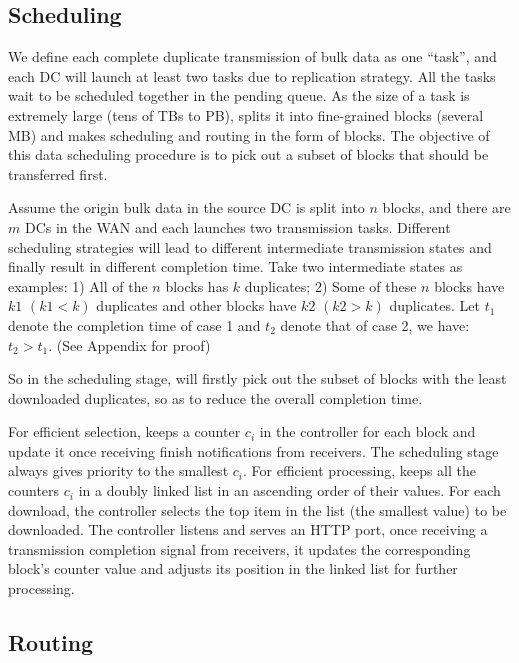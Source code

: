 \subsection{Scheduling}
\label{subsec:logic:scheduling}

We define each complete duplicate transmission of bulk data as one ``task'', and each DC will launch at least two tasks due to replication strategy. All the tasks wait to be scheduled together in the pending queue. As the size of a task is extremely large (tens of TBs to PB), \name splits it into fine-grained blocks (several MB) and makes scheduling and routing in the form of blocks. The objective of this data scheduling procedure is to pick out a subset of blocks that should be transferred first.

Assume the origin bulk data in the source DC is split into $n$ blocks, and there are $m$ DCs in the WAN and each launches two transmission tasks. Different scheduling strategies will lead to different intermediate transmission states and finally result in different completion time. Take two intermediate states as examples: 1) All of the $n$ blocks has $k$ duplicates; 2) Some of these $n$ blocks have $k1$ $(k1<k)$ duplicates and other blocks have $k2$ $(k2>k)$ duplicates. Let $t_1$ denote the completion time of case 1 and $t_2$ denote that of case 2, we have: $t_2 > t_1$. (See Appendix for proof)

So in the scheduling stage, \name will firstly pick out the subset of blocks with the least downloaded duplicates, so as to reduce the overall completion time.

For efficient selection, \name keeps a counter $c_i$ in the controller for each block and update it once receiving finish notifications from receivers. The scheduling stage always gives priority to the smallest $c_i$. For efficient processing, \name keeps all the counters $c_i$ in a doubly linked list in an ascending order of their values. For each download, the controller selects the top item in the list (the smallest value) to be downloaded. The controller listens and serves an HTTP port, once receiving a transmission completion signal from receivers, it updates the corresponding block's counter value and adjusts its position in the linked list for further processing.

\subsection{Routing}
\label{subsec:logic:routing}

